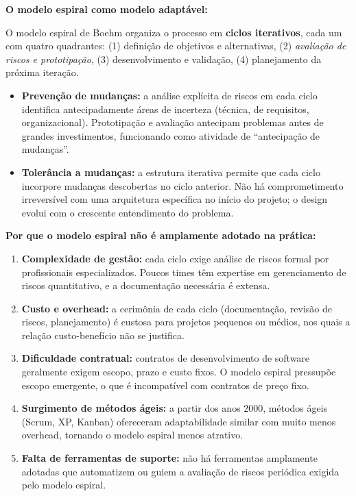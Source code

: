 \documentclass[12pt,a4paper]{article}
\begin{document}
\begin{resposta}

\textbf{O modelo espiral como modelo adaptável:}

O modelo espiral de Boehm organiza o processo em \textbf{ciclos iterativos},
cada um com quatro quadrantes: (1) definição de objetivos e alternativas,
(2) \emph{avaliação de riscos e prototipação}, (3) desenvolvimento e validação,
(4) planejamento da próxima iteração.

\begin{itemize}
  \item \textbf{Prevenção de mudanças:} a análise explícita de riscos em cada
        ciclo identifica antecipadamente áreas de incerteza (técnica, de
        requisitos, organizacional). Prototipação e avaliação antecipam problemas
        antes de grandes investimentos, funcionando como atividade de
        ``antecipação de mudanças''.

  \item \textbf{Tolerância a mudanças:} a estrutura iterativa permite que cada
        ciclo incorpore mudanças descobertas no ciclo anterior. Não há
        comprometimento irreversível com uma arquitetura específica no início
        do projeto; o design evolui com o crescente entendimento do problema.
\end{itemize}

\textbf{Por que o modelo espiral não é amplamente adotado na prática:}

\begin{enumerate}
  \item \textbf{Complexidade de gestão:} cada ciclo exige análise de riscos
        formal por profissionais especializados. Poucos times têm expertise
        em gerenciamento de riscos quantitativo, e a documentação necessária
        é extensa.

  \item \textbf{Custo e overhead:} a cerimônia de cada ciclo (documentação,
        revisão de riscos, planejamento) é custosa para projetos pequenos ou
        médios, nos quais a relação custo-benefício não se justifica.

  \item \textbf{Dificuldade contratual:} contratos de desenvolvimento de software
        geralmente exigem escopo, prazo e custo fixos. O modelo espiral pressupõe
        escopo emergente, o que é incompatível com contratos de preço fixo.

  \item \textbf{Surgimento de métodos ágeis:} a partir dos anos 2000, métodos
        ágeis (Scrum, XP, Kanban) ofereceram adaptabilidade similar com muito
        menos overhead, tornando o modelo espiral menos atrativo.

  \item \textbf{Falta de ferramentas de suporte:} não há ferramentas amplamente
        adotadas que automatizem ou guiem a avaliação de riscos periódica
        exigida pelo modelo espiral.
\end{enumerate}

\end{resposta}
\end{document}
